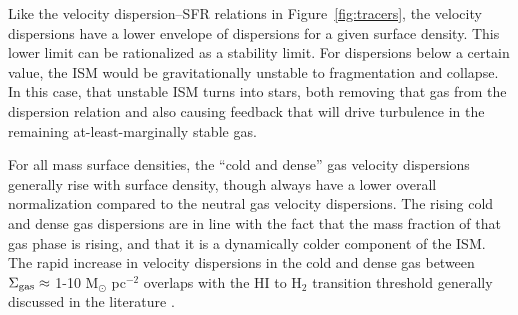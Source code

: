\documentclass[usletter,fleqn,usenatbib]{mnras}
\begin{document}
Like the velocity dispersion--SFR relations in Figure~\ref{fig:tracers}, the velocity dispersions have a lower envelope of dispersions for a given surface density.  This lower limit can be rationalized as a stability limit.  For dispersions below a certain value, the ISM would be gravitationally unstable to fragmentation and collapse.  In this case, that unstable ISM turns into stars, both removing that gas from the dispersion relation and also causing feedback that will drive turbulence in the remaining at-least-marginally stable gas.

For all mass surface densities, the ``cold and dense'' gas velocity dispersions generally rise with surface density, though always have a lower overall normalization compared to the neutral gas velocity dispersions.  The rising cold and dense gas dispersions are in line with the fact that the mass fraction of that gas phase is rising, and that it is a dynamically colder component of the ISM.  The rapid increase in velocity dispersions in the cold and dense gas between $\Sigma_{\rm gas} \approx$ 1-10 M$_\odot$ pc$^{-2}$ overlaps with the H{\scriptsize I} to H$_2$ transition threshold generally discussed in the literature \citep{Krumholz2008, Sternberg2014, Pineda2017}.
\end{document}
